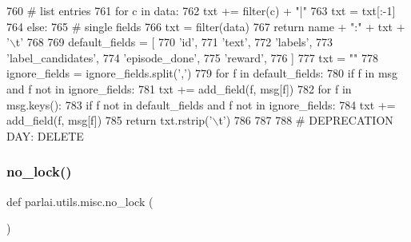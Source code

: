 \begin{DoxyCode}
760             \textcolor{comment}{# list entries}
761             \textcolor{keywordflow}{for} c \textcolor{keywordflow}{in} data:
762                 txt += filter(c) + \textcolor{stringliteral}{"|"}
763             txt = txt[:-1]
764         \textcolor{keywordflow}{else}:
765             \textcolor{comment}{# single fields}
766             txt = filter(data)
767         \textcolor{keywordflow}{return} name + \textcolor{stringliteral}{":"} + txt + \textcolor{stringliteral}{'\(\backslash\)t'}
768 
769     default\_fields = [
770         \textcolor{stringliteral}{'id'},
771         \textcolor{stringliteral}{'text'},
772         \textcolor{stringliteral}{'labels'},
773         \textcolor{stringliteral}{'label\_candidates'},
774         \textcolor{stringliteral}{'episode\_done'},
775         \textcolor{stringliteral}{'reward'},
776     ]
777     txt = \textcolor{stringliteral}{""}
778     ignore\_fields = ignore\_fields.split(\textcolor{stringliteral}{','})
779     \textcolor{keywordflow}{for} f \textcolor{keywordflow}{in} default\_fields:
780         \textcolor{keywordflow}{if} f \textcolor{keywordflow}{in} msg \textcolor{keywordflow}{and} f \textcolor{keywordflow}{not} \textcolor{keywordflow}{in} ignore\_fields:
781             txt += add\_field(f, msg[f])
782     \textcolor{keywordflow}{for} f \textcolor{keywordflow}{in} msg.keys():
783         \textcolor{keywordflow}{if} f \textcolor{keywordflow}{not} \textcolor{keywordflow}{in} default\_fields \textcolor{keywordflow}{and} f \textcolor{keywordflow}{not} \textcolor{keywordflow}{in} ignore\_fields:
784             txt += add\_field(f, msg[f])
785     \textcolor{keywordflow}{return} txt.rstrip(\textcolor{stringliteral}{'\(\backslash\)t'})
786 
787 
788 \textcolor{comment}{# DEPRECATION DAY: DELETE}
\end{DoxyCode}
\mbox{\label{namespaceparlai_1_1utils_1_1misc_a38a23cfa0fc3dbed42846787d1c04b57}} 
\subsubsection{\texorpdfstring{no\+\_\+lock()}{no\_lock()}}
{\footnotesize\ttfamily def parlai.\+utils.\+misc.\+no\+\_\+lock (\begin{DoxyParamCaption}{ }\end{DoxyParamCaption})}

